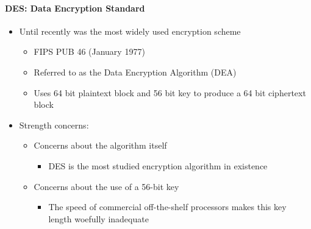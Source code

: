 \documentclass{article}
\begin{document}
                            \paragraph{DES: Data Encryption Standard}
                                        \begin{itemize}
                                            \item Until recently was the most widely used encryption scheme
                                            \begin{itemize}
                                                \item FIPS PUB 46 (January 1977)
                                                \item Referred to as the Data Encryption Algorithm (DEA)
                                                \item Uses 64 bit plaintext block and 56 bit key to produce a 64 bit ciphertext block
                                            \end{itemize}
                                            \item Strength concerns:
                                            \begin{itemize}
                                                \item Concerns about the algorithm itself
                                                \begin{itemize}
                                                    \item DES is the most studied encryption algorithm in existence
                                                \end{itemize}
                                                \item Concerns about the use of a 56-bit key
                                                \begin{itemize}
                                                    \item The speed of commercial off-the-shelf processors makes this key length woefully inadequate
                                                \end{itemize}
                                            \end{itemize}
                                        \end{itemize}
\end{document}
